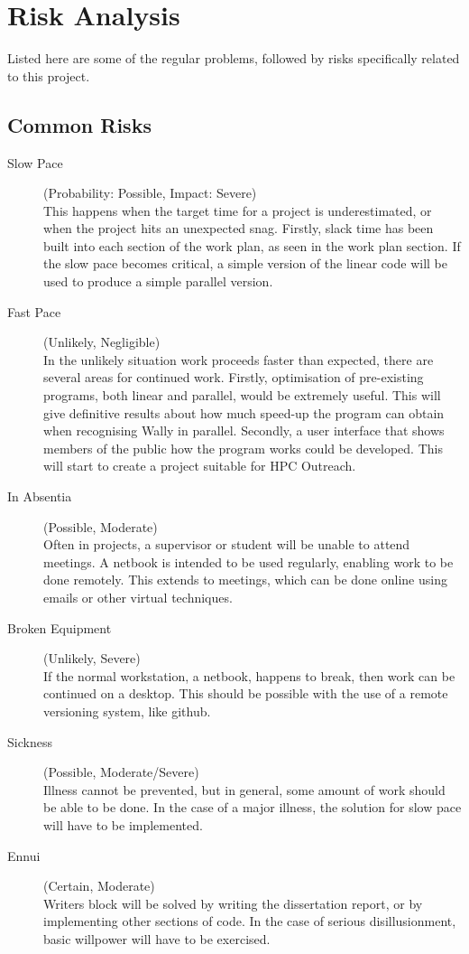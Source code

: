 \documentclass[../main.tex]{subfiles}
\begin{document}
  \section{Risk Analysis}
    Listed here are some of the regular problems, followed by risks specifically related to this project.
  \subsection{Common Risks}
    \begin{description}
      \item[Slow Pace] (Probability: Possible, Impact: Severe)\\
        This happens when the target time for a project is underestimated, or when the project hits an unexpected snag.
        Firstly, slack time has been built into each section of the work plan, as seen in the work plan section.
        If the slow pace becomes critical, a simple version of the linear code will be used to produce a simple parallel version.
      \item[Fast Pace] (Unlikely, Negligible)\\
        In the unlikely situation work proceeds faster than expected, there are several areas for continued work.
        Firstly, optimisation of pre-existing programs, both linear and parallel, would be extremely useful.
        This will give definitive results about how much speed-up the program can obtain when recognising Wally in parallel.
        Secondly, a user interface that shows members of the public how the program works could be developed.
        This will start to create a project suitable for HPC Outreach.
      \item[In Absentia] (Possible, Moderate)\\
        Often in projects, a supervisor or student will be unable to attend meetings.
        A netbook is intended to be used regularly, enabling work to be done remotely.
        This extends to meetings, which can be done online using emails or other virtual techniques.
      \item[Broken Equipment] (Unlikely, Severe)\\
        If the normal workstation, a netbook, happens to break, then work can be continued on a desktop.
        This should be possible with the use of a remote versioning system, like github.
      \item[Sickness] (Possible, Moderate/Severe)\\
        Illness cannot be prevented, but in general, some amount of work should be able to be done.
        In the case of a major illness, the solution for slow pace will have to be implemented.
      \item[Ennui] (Certain, Moderate)\\
        Writers block will be solved by writing the dissertation report, or by implementing other sections of code.
        In the case of serious disillusionment, basic willpower will have to be exercised.
        
    \end{description}
\end{document}
